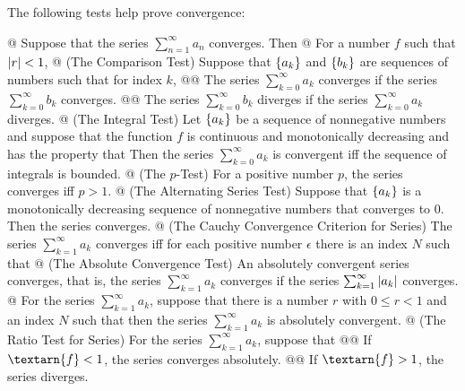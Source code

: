     \begin{thm}
        The following tests help prove convergence:

        \begin{easylist}[enumerate]
            @ Suppose that the series $\sum_{n=1}^\infty a_n$ converges. Then
            @ For a number $f$ such that ${\left\lvert r \right\rvert} < 1$,
            @ (The Comparison Test) Suppose that ${\left\{ a_k \right\}}$ and ${\left\{ b_k \right\}}$ are sequences of numbers such that for
            index $k$,
            @@ The series $\sum_{k=0}^\infty a_k$ converges if the series $\sum_{k=0}^\infty b_k$ converges.
            @@ The series $\sum_{k=0}^\infty b_k$ diverges if the series $\sum_{k=0}^\infty a_k$ diverges.
            @ (The Integral Test) Let ${\left\{ a_k \right\}}$ be a sequence of nonnegative numbers and suppose that the function
            $f$ is continuous and monotonically decreasing and has the property that
            Then the series $\sum_{k=0}^\infty a_k$ is convergent iff the sequence of integrals
            is bounded.
            @ (The $p$-Test) For a positive number $p$, the series
            converges iff $p > 1$.
            @ (The Alternating Series Test) Suppose that ${\left\{ a_k \right\}}$ is a monotonically decreasing sequence of
            nonnegative numbers that converges to $0$. Then the series
            converges.
            @ (The Cauchy Convergence Criterion for Series) The series $\sum_{k=1}^\infty a_k$ converges iff for each
            positive number $\epsilon$ there is an index $N$ such that
            @ (The Absolute Convergence Test) An absolutely convergent series converges, that is, the series
            $\sum_{k=1}^\infty a_k$ converges if the series $\sum_{k=1}^\infty {\left\lvert a_k \right\rvert}$ converges.
            @ For the series $\sum_{k=1}^\infty a_k$, suppose that there is a number $r$ with $0 \le r < 1$ and an index
            $N$ such that
            then the series $\sum_{k=1}^\infty a_k$ is absolutely convergent.
            @ (The Ratio Test for Series) For the series $\sum_{k=1}^\infty a_k$, suppose that
            @@ If $\textarn{f} < 1$, the series converges absolutely.
            @@ If $\textarn{f} > 1$, the series diverges.
        \end{easylist}
    \end{thm}

